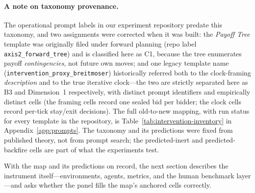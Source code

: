 \paragraph{A note on taxonomy provenance.}
The operational prompt labels in our experiment repository predate this taxonomy, and two assignments were corrected when it was built: the \emph{Payoff Tree} template was originally filed under forward planning (repo label \texttt{axis2\_forward\_tree}) and is classified here as C1, because the tree enumerates payoff \emph{contingencies}, not future own moves; and one legacy template name (\texttt{intervention\_proxy\_breitmoser}) historically referred both to the clock-framing \emph{description} and to the true iterative clock---the two are strictly separated here as B3 and Dimension~1 respectively, with distinct prompt identifiers and empirically distinct cells (the framing cells record one sealed bid per bidder; the clock cells record per-tick stay/exit decisions). The full old-to-new mapping, with run status for every template in the repository, is Table~\ref{tab:intervention-inventory} in Appendix~\ref{app:prompts}. The taxonomy and its predictions were fixed from published theory, not from prompt search; the predicted-inert and predicted-backfire cells are part of what the experiments test.

With the map and its predictions on record, the next section describes the instrument itself---environments, agents, metrics, and the human benchmark layer---and asks whether the panel fills the map's anchored cells correctly.
